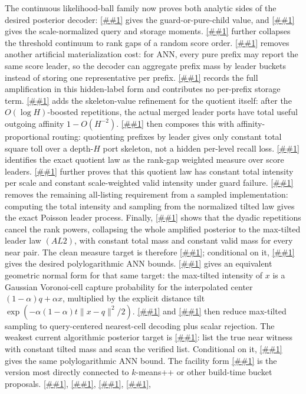 \documentclass[10pt]{article}
\newcommand{\cref}[1]{\ref{##1}}
\newcommand{\Cref}[1]{\ref{##1}}
\theoremstyle{definition}
\begin{document}
The continuous likelihood-ball family now proves both analytic sides of the desired posterior decoder: \cref{thm:continuous-likelihood-balls} gives the guard-or-pure-child value, and \cref{lem:ideal-likelihood-scale-profile} gives the scale-normalized query and storage moments. \Cref{lem:likelihood-rank-prefix} further collapses the threshold continuum to rank gaps of a random score order. \Cref{cor:likelihood-prefix-leader} removes another artificial materialization cost: for ANN, every pure prefix may report the same score leader, so the decoder can aggregate prefix mass by leader buckets instead of storing one representative per prefix. \Cref{lem:dyadic-leader-quotient} records the full amplification in this hidden-label form and contributes no per-prefix storage term. \Cref{cor:dyadic-leader-affinity-boost} adds the skeleton-value refinement for the quotient itself: after the \(O(\log H)\)-boosted repetitions, the actual merged leader ports have total useful outgoing affinity \(1-O(H^{-2})\). \Cref{cor:boosted-leader-skeleton-toll} then composes this with affinity-proportional routing: quotienting prefixes by leader gives only constant total square toll over a depth-\(H\) port skeleton, not a hidden per-level recall loss. \Cref{cor:likelihood-leader-intensity} identifies the exact quotient law as the rank-gap weighted measure over score leaders. \Cref{lem:ideal-likelihood-leader-law} further proves that this quotient law has constant total intensity per scale and constant scale-weighted valid intensity under guard failure. \Cref{lem:poissonized-normalized-leader-sampler} removes the remaining all-listing requirement from a sampled implementation: computing the total intensity and sampling from the normalized tilted law gives the exact Poisson leader process. Finally, \cref{lem:scale-amplified-alpha-leader} shows that the dyadic repetitions cancel the rank powers, collapsing the whole amplified posterior to the max-tilted leader law \((AL2)\), with constant total mass and constant valid mass for every near pair. The clean measure target is therefore \cref{asm:alpha-leader-sampler}; conditional on it, \cref{prop:alpha-leader-polylog} gives the desired polylogarithmic ANN bounds. \Cref{lem:alpha-leader-voronoi-capture} gives an equivalent geometric normal form for that same target: the max-tilted intensity of \(x\) is a Gaussian Voronoi-cell capture probability for the interpolated center \((1-\alpha)q+\alpha x\), multiplied by the explicit distance tilt \(\exp(-\alpha(1-\alpha)t\|x-q\|^2/2)\). \Cref{cor:query-centered-cell-reweighting} and \cref{cor:truncated-nearest-cell-compiler} then reduce max-tilted sampling to query-centered nearest-cell decoding plus scalar rejection. The weakest current algorithmic posterior target is \cref{asm:smoothed-witness-list}: list the true near witness with constant tilted mass and scan the verified list. Conditional on it, \cref{prop:witness-list-polylog} gives the same polylogarithmic ANN bound. The facility form \cref{cor:facility-bucket-witness} is the version most directly connected to \(k\)-means++ or other build-time bucket proposals. \Cref{lem:poisson-rate-coverage}, \cref{lem:finite-signature-rate-coverage}, \cref{lem:finite-poisson-rate-coverage-realization}, \cref{cor:finite-signature-retained-buckets}, 
\end{document}
